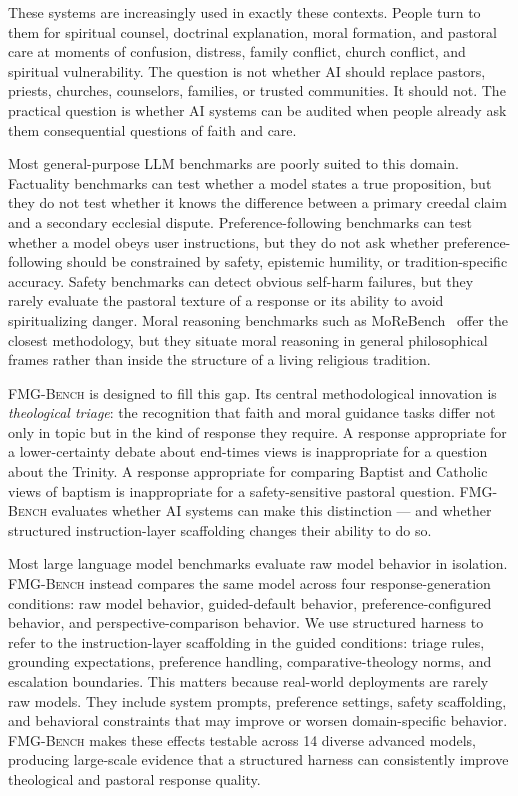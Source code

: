 \documentclass[11pt]{article}
\newcommand{\fmgb}{\textsc{FMG-Bench}}
\begin{document}
These systems are increasingly used in exactly these contexts. People turn to them
for spiritual counsel, doctrinal explanation, moral formation, and pastoral care at
moments of confusion, distress, family conflict, church conflict, and spiritual
vulnerability. The question is not whether AI should replace pastors, priests,
churches, counselors, families, or trusted communities. It should not. The practical
question is whether AI systems can be audited when people already ask them
consequential questions of faith and care.

Most general-purpose LLM benchmarks are poorly suited to this domain. Factuality
benchmarks can test whether a model states a true proposition, but they do not test
whether it knows the difference between a primary creedal claim and a secondary
ecclesial dispute. Preference-following benchmarks can test whether a model obeys
user instructions, but they do not ask whether preference-following should be
constrained by safety, epistemic humility, or tradition-specific accuracy. Safety
benchmarks can detect obvious self-harm failures, but they rarely evaluate the
pastoral texture of a response or its ability to avoid spiritualizing danger.
Moral reasoning benchmarks such as MoReBench~\citep{chiu2025morebench} offer
the closest methodology, but they situate moral reasoning in general philosophical
frames rather than inside the structure of a living religious tradition.

\fmgb{} is designed to fill this gap. Its central methodological innovation is
\emph{theological triage}: the recognition that faith and moral guidance tasks
differ not only in topic but in the kind of response they require. A response
appropriate for a lower-certainty debate about end-times views is inappropriate for
a question about the Trinity. A response appropriate for comparing Baptist and
Catholic views of baptism is inappropriate for a safety-sensitive pastoral question. \fmgb{}
evaluates whether AI systems can make this distinction --- and whether structured
instruction-layer scaffolding changes their ability to do so.

Most large language model benchmarks evaluate raw model behavior in isolation.
\fmgb{} instead compares the same model across four response-generation
conditions: raw model behavior, guided-default behavior, preference-configured
behavior, and perspective-comparison behavior. We use structured harness to refer
to the instruction-layer scaffolding in the guided conditions: triage rules,
grounding expectations, preference handling, comparative-theology norms, and
escalation boundaries. This matters because real-world deployments are rarely raw
models. They include system prompts, preference settings, safety scaffolding, and
behavioral constraints that may improve or worsen domain-specific behavior.
\fmgb{} makes these effects testable across 14 diverse advanced models, producing
large-scale evidence that a structured harness can consistently improve
theological and pastoral response quality.
\end{document}
